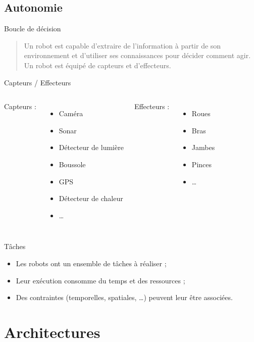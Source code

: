 \documentclass[compress]{beamer}
\begin{document}
\subsection{Autonomie}
\begin{frame}{Boucle de décision}
\begin{quote}
Un robot est capable d'extraire de l'information à partir de son environnement et d'utiliser ses connaissances pour décider comment agir. Un robot est équipé de capteurs et d'effecteurs.
\end{quote}
\end{frame}

\begin{frame}{Capteurs / Effecteurs}
\begin{columns}
	Capteurs :
	\begin{itemize}
	\item Caméra
	\item Sonar
	\item Détecteur de lumière
	\item Boussole
	\item GPS
	\item Détecteur de chaleur
	\item \dots
	\end{itemize}
	Effecteurs :
	\begin{itemize}
	\item Roues
	\item Bras
	\item Jambes
	\item Pinces
	\item \dots
	\end{itemize}
\end{columns}
\end{frame}

\begin{frame}{Tâches}
\begin{itemize}
\item Les robots ont un ensemble de tâches à réaliser ;
\item Leur exécution consomme du temps et des ressources ;
\item Des contraintes (temporelles, spatiales, \dots) peuvent leur être associées.
\end{itemize}
\end{frame}

\section{Architectures}
\end{document}
